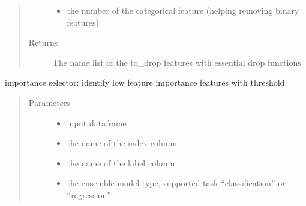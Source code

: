 \documentclass[letterpaper,11pt,english]{sphinxmanual}
\begin{document}
\begin{fulllineitems}
\begin{fulllineitems}
\begin{quote}
\begin{description}
\begin{itemize}
\item {} 
 \textendash{} the number of the categorical feature (helping removing binary features)

\end{itemize}

\item[{Returns}] \leavevmode
The name list of the to\_drop features with essential  drop functions

\end{description}\end{quote}

\end{fulllineitems}


\begin{fulllineitems}
\label{\detokenize{auto_feature:AutoFeatures.AutoFeatures.importance_selector}}
importance selector: identify low feature importance features with threshold
\begin{quote}\begin{description}
\item[{Parameters}] \leavevmode\begin{itemize}
\item {} 
 \textendash{} input dataframe

\item {} 
 \textendash{} the name of the index column

\item {} 
 \textendash{} the name of the label column

\item {} 
 \textendash{} the ensemble model type, supported task “classification” or “regression”


\end{itemize}
\end{description}
\end{quote}
\end{fulllineitems}
\end{fulllineitems}
\end{document}
